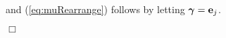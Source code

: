 \documentclass[11pt]{article}
\newtheorem{Main Result}{Main Result}
\def\vectorfontone{\bf}
\def\vectorfonttwo{\boldsymbol}
\def\ve{{\vectorfontone e}}                      %
\def\vu{{\vectorfontone u}}                      %
\def\vy{{\vectorfontone y}}                      %
\def\vgamma{{\vectorfonttwo \gamma}}             %
\def\vmu{{\vectorfonttwo \mu}}                   %
\def\matrixfontone{\bf}
\def\matrixfonttwo{\boldsymbol}
\def\mD{{\matrixfontone D}}                      %
\def\mW{{\matrixfontone W}}                      %
\def\mX{{\matrixfontone X}}                      %
\def\mSigma{{\matrixfonttwo \Sigma}}             %
\def\ds{\displaystyle}
\begin{document}
\noindent and (\ref{eq:muRearrange}) follows by letting $\vgamma=\ve_j$.
%
%
\vspace{-0.5cm}\begin{flushright}$\Box$\end{flushright}
\end{document}
